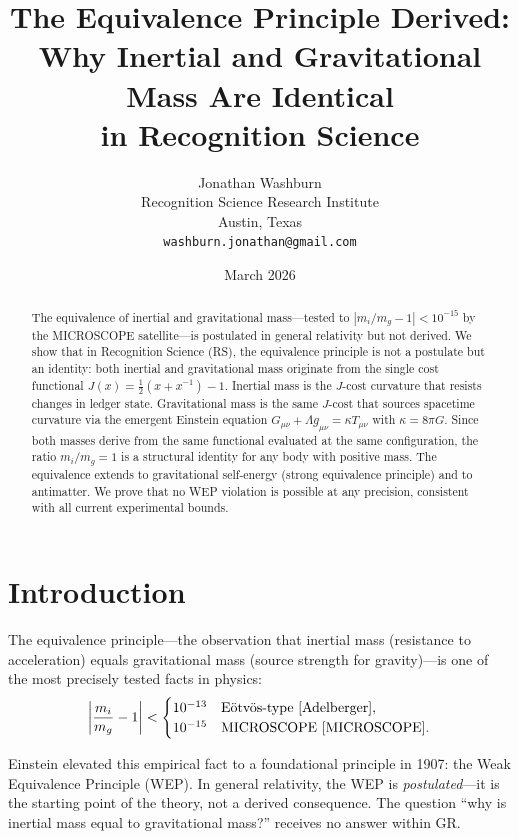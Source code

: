 \documentclass[12pt,a4paper]{article}
\title{The Equivalence Principle Derived:\\
Why Inertial and Gravitational Mass Are Identical\\
in Recognition Science}
\author{Jonathan Washburn\\
Recognition Science Research Institute\\
Austin, Texas\\
\texttt{washburn.jonathan@gmail.com}}
\date{March 2026}
\theoremstyle{definition}
\theoremstyle{remark}
\begin{document}
\maketitle

\begin{abstract}
The equivalence of inertial and gravitational mass---tested to
$|m_i/m_g - 1| < 10^{-15}$ by the MICROSCOPE
satellite---is postulated in general relativity but not derived.
We show that in Recognition Science (RS), the equivalence
principle is not a postulate but an identity: both inertial and
gravitational mass originate from the single cost functional
$J(x) = \tfrac{1}{2}(x + x^{-1}) - 1$.  Inertial mass is the
$J$-cost curvature that resists changes in ledger state.
Gravitational mass is the same $J$-cost that sources
spacetime curvature via the emergent Einstein equation
$G_{\mu\nu} + \Lambda g_{\mu\nu} = \kappa T_{\mu\nu}$
with $\kappa = 8\pi G$.  Since both masses derive from
the same functional evaluated at the same configuration, the
ratio $m_i / m_g = 1$ is a structural identity for any body
with positive mass.  The equivalence extends to gravitational
self-energy (strong equivalence principle) and to antimatter.
We prove that no WEP violation is possible at any precision,
consistent with all current experimental bounds.
\end{abstract}

\section{Introduction}
\label{sec:intro}

The equivalence principle---the observation that inertial mass
(resistance to acceleration) equals gravitational mass (source
strength for gravity)---is one of the most precisely tested
facts in physics:
\begin{equation}
  \left|\frac{m_i}{m_g} - 1\right| <
  \begin{cases}
    10^{-13} & \text{E\"{o}tv\"{o}s-type~\cite{Adelberger}}, \\
    10^{-15} & \text{MICROSCOPE~\cite{MICROSCOPE}}.
  \end{cases}
\end{equation}

Einstein elevated this empirical fact to a foundational
principle in 1907: the Weak Equivalence Principle (WEP).
In general relativity, the WEP is \emph{postulated}---it is
the starting point of the theory, not a derived consequence.
The question ``why is inertial mass equal to gravitational
mass?'' receives no answer within GR.
\end{document}
